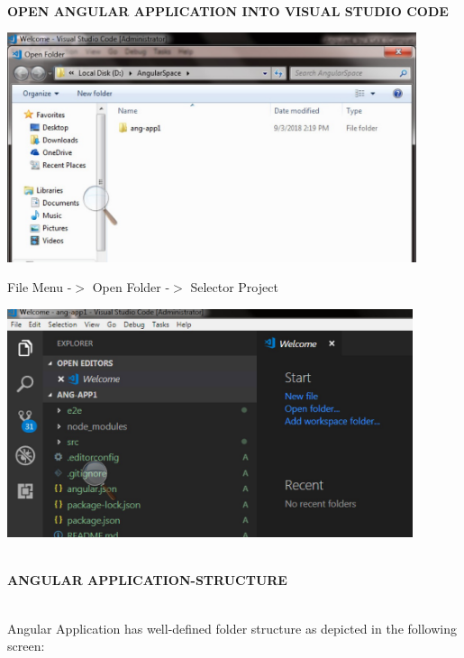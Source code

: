 \documentclass{article}
\begin{document}
\noindent 
\newpage
\noindent \\ {\large \textbf{OPEN ANGULAR APPLICATION INTO VISUAL STUDIO CODE}}

\begin{center}
	\noindent \includegraphics*[width=4.73in, height=2.65in]{IMG-01-32} 
\end{center}
File Menu -$\mathrm{>}$ Open Folder -$\mathrm{>}$ Selector Project



\begin{center}
	\noindent \includegraphics*[width=4.69in, height=2.64in]{IMG-01-33}
\end{center}


\newpage
\noindent \\ {\large \textbf{ANGULAR APPLICATION-STRUCTURE}}



\noindent \\ Angular Application has well-defined folder structure as depicted in the following screen:
\end{document}

